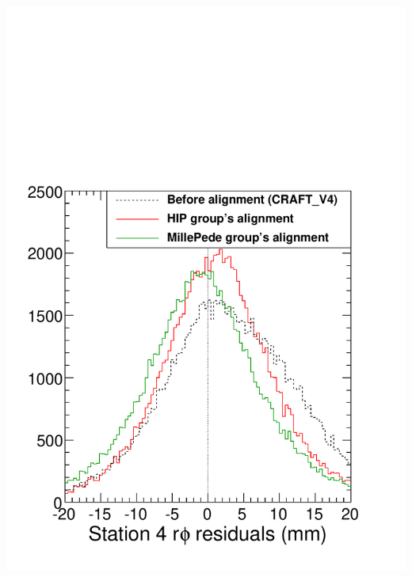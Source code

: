 \documentclass[compress]{beamer}
\begin{document}
\begin{frame}
\begin{columns}
\includegraphics[width=\linewidth]{raw_station4.pdf}
\end{columns}
\end{frame}
\end{document}
